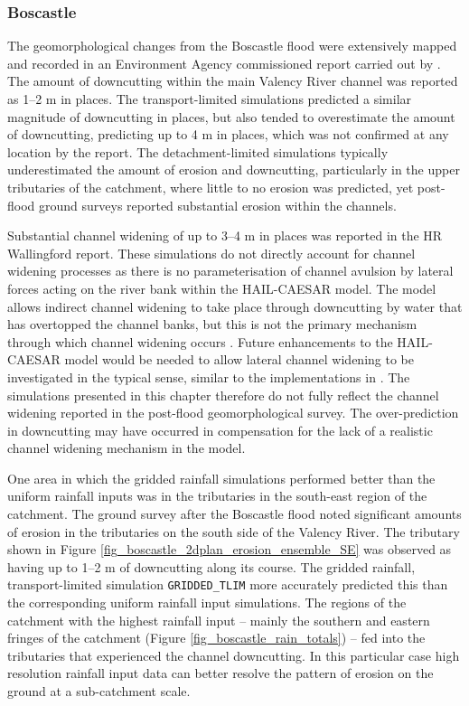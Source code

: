 \subsubsection{Boscastle}
The geomorphological changes from the Boscastle flood were extensively mapped and recorded in an Environment Agency commissioned report carried out by \citet{wallingford2005flooding}. The amount of downcutting within the main Valency River channel was reported as 1--2 m in places. The transport-limited simulations predicted  a similar magnitude of downcutting in places, but also tended to overestimate the amount of downcutting, predicting up to 4 m in places, which was not confirmed at any location by the \citet{wallingford2005flooding} report. The detachment-limited simulations typically underestimated the amount of erosion and downcutting, particularly in the upper tributaries of the catchment, where little to no erosion was predicted, yet post-flood ground surveys reported substantial erosion within the channels. 

Substantial channel widening of up to 3--4 m in places was reported in the HR Wallingford report. These simulations do not directly account for channel widening processes as there is no parameterisation of channel avulsion by lateral forces acting on the river bank within the HAIL-CAESAR model. The model allows indirect channel widening to take place through downcutting by water that has overtopped the channel banks, but this is not the primary mechanism through which channel widening occurs \citep{parker1976cause}. Future enhancements to the HAIL-CAESAR model would be needed to allow lateral channel widening to be investigated in the typical sense, similar to the implementations in \citet{murray1997properties,Coulthard2013}. The simulations presented in this chapter therefore do not fully reflect the channel widening reported in the post-flood geomorphological survey. The over-prediction in downcutting may have occurred in compensation for the lack of a realistic channel widening mechanism in the model.

One area in which the gridded rainfall simulations performed better than the uniform rainfall inputs was in the tributaries in the south-east region of the catchment. The ground survey after the Boscastle flood noted significant amounts of erosion in the tributaries on the south side of the Valency River. The tributary shown in Figure \ref{fig_boscastle_2dplan_erosion_ensemble_SE} was observed as having up to 1--2 m of downcutting along its course. The gridded rainfall, transport-limited simulation \texttt{GRIDDED\_TLIM} more accurately predicted this than the corresponding uniform rainfall input simulations. The regions of the catchment with the highest rainfall input -- mainly the southern and eastern fringes of the catchment (Figure \ref{fig_boscastle_rain_totals}) -- fed into the tributaries that experienced the channel downcutting. In this particular case high resolution rainfall input data can better resolve the pattern of erosion on the ground at a sub-catchment scale.

